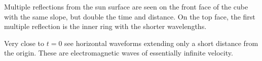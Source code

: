 
\par
Multiple reflections from the sun surface are seen
on the front face of the cube with the same slope,
but double the time and distance.
On the top face, the first multiple reflection
is the inner ring with the shorter wavelengths.

Very close to $t=0$ see horizontal waveforms
extending only a short distance from the origin.
These are electromagnetic waves of essentially infinite velocity.




